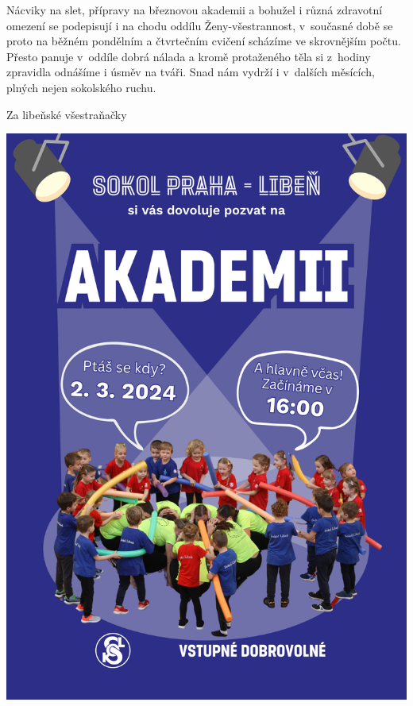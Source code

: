 \documentclass[11pt]{article}
\begin{document}
\vspace*{24pt}

Nácviky na slet, přípravy na březnovou akademii a bohužel i různá zdravotní omezení se podepisují i na chodu oddílu Ženy-všestrannost, v~současné době se proto na běžném pondělním a čtvrtečním cvičení scházíme ve skrovnějším počtu. Přesto panuje v~oddíle dobrá nálada a kromě protaženého těla si z~hodiny zpravidla odnášíme i úsměv na tváři. Snad nám vydrží i v~dalších měsících, plných nejen sokolského ruchu.   

Za libeňské všestraňačky

\signature{Dubina}{}

\clearpage

\pagestyle{blank}
\begin{center}
  \noindent\includegraphics[width=\linewidth]{Akademie_24.png}
\end{center}
\restoregeometry
\end{document}
